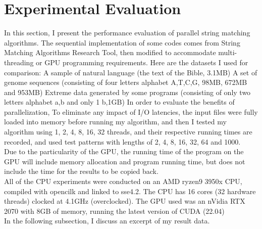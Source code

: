 \documentclass[11pt]{article}       %
\newcommand{\includeFig}[3]      {\begin{figure}[htb] \begin{center}
                                 \includegraphics
                                 [width=4in,keepaspectratio] %
                                 {#2}\caption{\label{#1}#3} \end{center} \end{figure}}
\begin{document}

\section{Experimental Evaluation} \label{expEval}

In this section, I present the performance evaluation of parallel string matching algorithms. The sequential implementation of some codes comes from String Matching Algorithms Research Tool, then modified to accommodate multi-threading or GPU programming requirements.
Here are the datasets I used for comparison:
A sample of natural language (the text of the Bible, 3.1MB) 
A set of genome sequences (consisting of four letters alphabet {A,T,C,G}, 98MB, 672MB and 953MB)
Extreme data generated by some programs (consisting of only two letters alphabet {a,b} and only 1 b,1GB)
In order to evaluate the benefits of parallelization, To eliminate any impact of I/O latencies, the input files were fully loaded into memory before running my algorithm, and then I tested my algorithm using 1, 2, 4, 8, 16, 32 threads, and their respective running times are recorded, and used test patterns with lengths of 2, 4, 8, 16, 32, 64 and 1000.\\
Due to the particularity of the GPU, the running time of the program on the GPU will include memory allocation and program running time, but does not include the time for the results to be copied back.\\

 All of the CPU experiments were conducted on an AMD ryzen9 3950x CPU, compiled with opencilk and linked to sse4.2. The CPU has 16 cores (32 hardware threads) clocked at 4.1GHz (overclocked). The GPU used was an nVidia RTX 2070 with 8GB of memory, running the latest version of CUDA (22.04)\\
In the following subsection, I discuss an excerpt of my result data.\\
\end{document}
